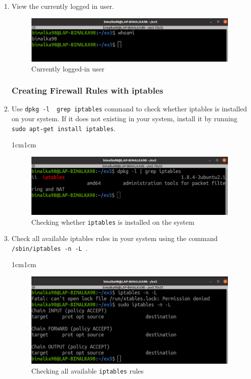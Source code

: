 \documentclass[11pt,letterpaper]{article}
\newenvironment{answer}{\em \color{blue} \begin{adjustwidth}{1cm}{1cm}}{\end{adjustwidth}}
\begin{document}
	\begin{enumerate}
		
		\item View the currently logged in user.
		
		\begin{figure}[H]
			\centering
			\includegraphics[width=0.65\columnwidth]{images/part1/1.png}
			\caption{Currently logged-in user} \label{fig:1}
		\end{figure}
		
		\subsubsection*{Creating Firewall Rules with iptables}
		
		\item Use \texttt{dpkg -l \textbar \ grep iptables} command to check whether iptables is installed on your system. If it does not existing in your system, install it by running \texttt{sudo apt-get install iptables}.
		
		\begin{answer}
			\begin{figure}[H]
				\centering
				\includegraphics[width=0.65\columnwidth]{images/part1/2.png}
				\caption{Checking whether {\tt iptables} is installed on the system}
			\end{figure}
		\end{answer}
		
		\item Check all available iptables rules in your system using the command \texttt{/sbin/iptables -n -L }.
		
		\begin{answer}
			\begin{figure}[H]
				\centering
				\includegraphics[width=0.65\columnwidth]{images/part1/3.png}
				\caption{Checking all available {\tt iptables} rules}
			\end{figure}
		\end{answer}
		

\end{enumerate}
\end{document}
